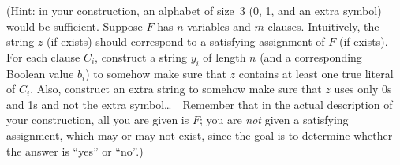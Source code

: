 \documentclass[11pt]{article}
\begin{document}
\begin{description}
(Hint: in your construction, an alphabet of size~3 (0, 1,
and an extra symbol) would be sufficient.  Suppose $F$ has $n$ variables and 
$m$ clauses.  Intuitively, the string $z$ (if exists) should correspond to a satisfying assignment of $F$ (if exists).  For each clause $C_i$, construct a string $y_i$ of length $n$ (and a corresponding Boolean value $b_i$) to somehow make sure that $z$
contains at least one true literal of $C_i$.  Also, construct an extra string to somehow make sure that $z$ uses only 0s and 1s and not the extra symbol\ldots\ \ Remember that in the actual description of your construction, 
all you are given is $F$; you are \emph{not} given a satisfying assignment, which may or may not exist, since the goal is to determine whether the answer is ``yes'' or ``no''.)

\end{description}
\end{document}
